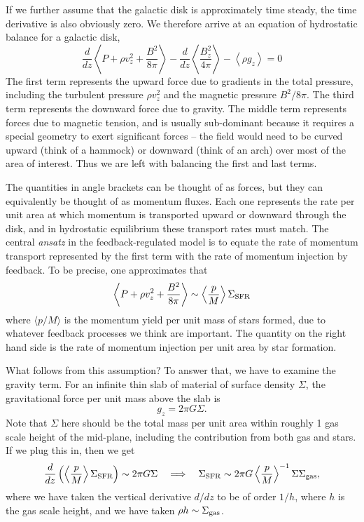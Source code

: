 If we further assume that the galactic disk is approximately time steady, the time derivative is also obviously zero. We therefore arrive at an equation of hydrostatic balance for a galactic disk,
\begin{equation}
\frac{d}{dz} \left\langle P + \rho v_z^2 + \frac{B^2}{8\pi}\right \rangle  - \frac{d}{dz} \left\langle\frac{B_z^2}{4\pi}\right\rangle - \left\langle \rho g_z\right\rangle = 0
\end{equation}
The first term represents the upward force due to gradients in the total pressure, including the turbulent pressure $\rho v_z^2$ and the magnetic pressure $B^2/8\pi$. The third term represents the downward force due to gravity. The middle term represents forces due to magnetic tension, and is usually sub-dominant because it requires a special geometry to exert significant forces -- the field would need to be curved upward (think of a hammock) or downward (think of an arch) over most of the area of interest. Thus we are left with balancing the first and last terms.

The quantities in angle brackets can be thought of as forces, but they can equivalently be thought of as momentum fluxes. Each one represents the rate per unit area at which momentum is transported upward or downward through the disk, and in hydrostatic equilibrium these transport rates must match. The central \textit{ansatz} in the feedback-regulated model is to equate the rate of momentum transport represented by the first term with the rate of momentum injection by feedback. To be precise, one approximates that
\begin{equation}
\left \langle P + \rho v_z^2 + \frac{B^2}{8\pi}\right \rangle \sim \left\langle\frac{p}{M}\right\rangle \Sigma_{\rm SFR}
\end{equation}
where $\langle p/M\rangle$ is the momentum yield per unit mass of stars formed, due to whatever feedback processes we think are important. The quantity on the right hand side is the rate of momentum injection per unit area by star formation.

What follows from this assumption? To answer that, we have to examine the gravity term. For an infinite thin slab of material of surface density $\Sigma$, the gravitational force per unit mass above the slab is
\begin{equation}
g_z = 2\pi G \Sigma.
\end{equation}
Note that $\Sigma$ here should be the total mass per unit area within roughly 1 gas scale height of the mid-plane, including the contribution from both gas and stars. If we plug this in, then we get
\begin{equation}
\frac{d}{dz} \left(\left\langle \frac{p}{M}\right\rangle \Sigma_{\rm SFR}\right) \sim 2\pi G \Sigma
\quad \Longrightarrow \quad
\Sigma_{\rm SFR} \sim 2\pi G \left\langle \frac{p}{M}\right\rangle^{-1} \Sigma \Sigma_{\rm gas} ,
\end{equation}
where we have taken the vertical derivative $d/dz$ to be of order $1/h$, where $h$ is the gas scale height, and we have taken $\rho h \sim \Sigma_{\rm gas}$.

